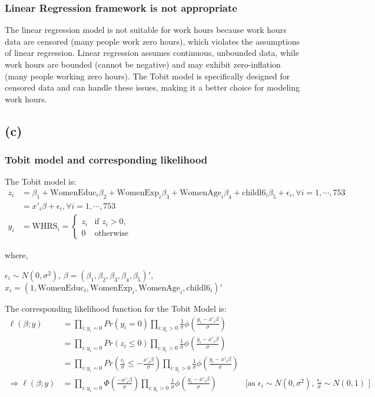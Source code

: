 \documentclass[a4paper]{article}
\begin{document}
\subsubsection*{Linear Regression framework is not appropriate }
The linear regression model is not suitable for work hours because work hours data are censored (many people work zero hours), which violates the assumptions of linear regression. Linear regression assumes continuous, unbounded data, while work hours are bounded (cannot be negative) and may exhibit zero-inflation (many people working zero hours). The Tobit model is specifically designed for censored data and can handle these issues, making it a better choice for modeling work hours.


\subsection*{(c)}

\subsubsection*{Tobit model and corresponding likelihood}

The Tobit model is:
\begin{align*}
    z_{i} &= \beta_{1} + \text{WomenEduc}_{i}\beta_{2} + \text{WomenExp}_{i}\beta_{3} + \text{WomenAge}_{i}\beta_{4} + \text{childl6}_{i}\beta_{5} + \epsilon_{i}, \forall i = 1, \cdots, 753  \\
    &= x'_{i} \beta + \epsilon_{i}, \forall i = 1, \cdots, 753 \\
    y_{i} &= \text{WHRS}_{i} =
\begin{cases} 
z_{i} & \text{if } z_{i} > 0, \\
0 & \text{otherwise}
\end{cases}
\end{align*}

where, 

$\epsilon_{i} \sim N(0, \sigma^2)$, $\beta = (\beta_{1}, \beta_{2},\beta_{3},\beta_{4},\beta_{5})'$,
$x_{i} = (1,\text{WomenEduc}_{i},\text{WomenExp}_{i}, \text{WomenAge}_{i}, \text{childl6}_i)'$
\vspace{4pt}

The corresponding likelihood function for the Tobit Model is:
\begin{align*}
    \ell(\beta;y) &= \prod_{i : y_i = 0} Pr(y_i = 0) \prod_{i : y_i > 0} \frac{1}{\sigma}\phi(\frac{y_i - x'_i\beta}{\sigma}) \\
    &= \prod_{i : y_i = 0} Pr(z_i \leq 0) \prod_{i : y_i > 0} \frac{1}{\sigma} \phi(\frac{y_i - x'_i\beta}{\sigma}) \\
    &= \prod_{i : y_i = 0} Pr(\frac{\epsilon_i}{\sigma} \leq -\frac{x'_i\beta}{\sigma}) \prod_{i : y_i > 0} \frac{1}{\sigma} \phi(\frac{y_i - x'_i\beta}{\sigma}) \\
    \Rightarrow \ell(\beta;y) &= \prod_{i : y_i = 0} \Phi (\frac{-x'_i\beta}{\sigma}) \prod_{i : y_i > 0} \frac{1}{\sigma} \phi(\frac{y_i - x'_i\beta}{\sigma}) & \text{[as $\epsilon_i \sim  N(0,\sigma^2)$, $\frac{\epsilon_i}{\sigma} \sim N(0,1)$ ]}
\end{align*}
\end{document}
